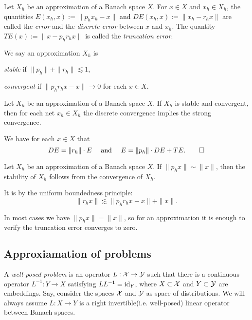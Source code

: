 \documentclass{../../large}
\begin{document}
\begin{defn}[Errors]
Let $X_h$ be an approximation of a Banach space $X$.
For $x\in X$ and $x_h\in X_h$, the quantities $E(x_h,x):=\|p_hx_h-x\|$ and $DE(x_h,x):=\|x_h-r_hx\|$ are called the \emph{error} and the \emph{discrete error} between $x$ and $x_h$.
The quantity $TE(x):=\|x-p_hr_hx\|$ is called the \emph{truncation error}.
\end{defn}

\begin{defn}
We say an approximation $X_h$ is
\begin{parts}
\item \emph{stable} if $\|p_h\|+\|r_h\|\lesssim1$,
\item \emph{convergent} if $\|p_hr_hx-x\|\to0$ for each $x\in X$.
\end{parts}
\end{defn}

\begin{lem}
Let $X_h$ be an approximation of a Banach space $X$.
If $X_h$ is stable and convergent, then for each net $x_h\in X_h$ the discrete convergence implies the strong convergence.
\end{lem}
\begin{pf}
We have for each $x\in X$ that
\[DE=\|r_h\|\cdot E\quad\text{ and }\quad E=\|p_h\|\cdot DE+TE.\qedhere\]
\end{pf}

\begin{lem}
Let $X_h$ be an approximation of a Banach space $X$.
If $\|p_hx\|\sim\|x\|$, then the stability of $X_h$ follows from the convergence of $X_h$.
\end{lem}
\begin{pf}
It is by the uniform boundedness principle:
\[\|r_hx\|\lesssim\|p_hr_hx-x\|+\|x\|.\]
\end{pf}
In most cases we have $\|p_hx\|=\|x\|$, so for an approximation it is enough to verify the truncation error converges to zero.



\subsection{Approxiamation of problems}

A \emph{well-posed problem} is an operator $L:\mathcal{X}\to\mathcal{Y}$ such that there is a continuous operator $L^{-1}:Y\to X$ satisfying $LL^{-1}=\operatorname{id}_Y$, where $X\subset\mathcal{X}$ and $Y\subset\mathcal{Y}$ are embeddings.
Say, consider the spaces $\mathcal{X}$ and $\mathcal{Y}$ as space of distributions.
We will always assume $L:X\to Y$ is a right invertible(i.e. well-posed) linear operator between Banach spaces.
\end{document}
